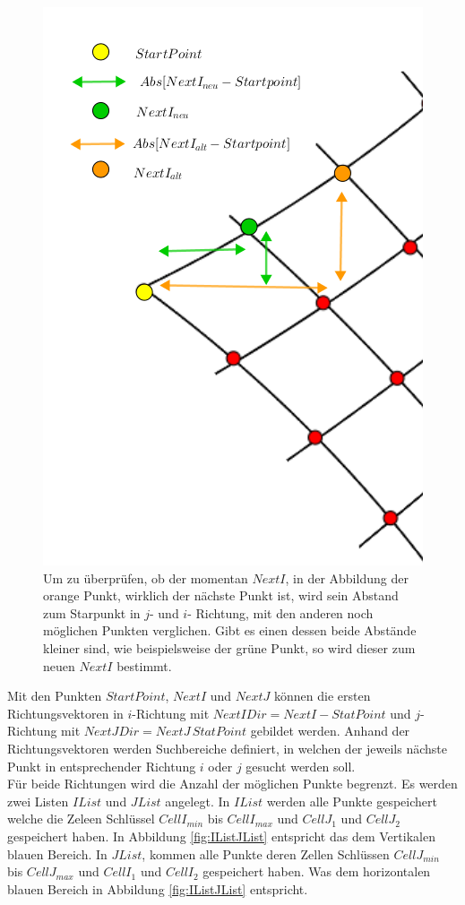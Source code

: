 \begin{figure}[!htb]
	\centering
	\includegraphics[width=0.5\linewidth]{images/SearchNextI.png}
	\caption[Überprüfung des gefundenen $NextI$]{Um zu überprüfen, ob der momentan $NextI$, in der Abbildung der orange Punkt, wirklich der nächste Punkt ist, wird sein Abstand zum Starpunkt in $j$- und  $i$- Richtung, mit den anderen noch möglichen Punkten verglichen. Gibt es einen dessen beide Abstände kleiner sind, wie beispielsweise der grüne Punkt, so wird dieser zum neuen $NextI$ bestimmt.}
	\label{fig:FindNextIJ}
\end{figure}
\pagebreak


Mit den Punkten $StartPoint$, $NextI$ und $NextJ$ können die ersten Richtungsvektoren in $i$-Richtung mit $NextIDir= NextI - StatPoint$ und $j$- Richtung mit $NextJDir =NextJ\,StatPoint$ gebildet werden. Anhand der Richtungsvektoren werden Suchbereiche definiert, in welchen der jeweils nächste Punkt in entsprechender Richtung $i$ oder $j$ gesucht werden soll.\\ 


Für beide Richtungen wird die Anzahl der möglichen Punkte begrenzt. Es werden zwei Listen $IList$ und $JList$ angelegt. In $IList$ werden alle Punkte gespeichert welche die Zeleen Schlüssel $CellI_{min}$ bis $CellI_{max}$ und $CellJ_1$ und $CellJ_2$ gespeichert haben. In Abbildung \ref{fig:IListJList} entspricht das dem Vertikalen blauen Bereich. In $JList$, kommen alle Punkte deren Zellen Schlüssen $CellJ_{min}$ bis $CellJ_{max}$ und $CellI_1$ und $CellI_2$ gespeichert haben. Was dem horizontalen blauen Bereich in Abbildung \ref{fig:IListJList} entspricht. \\

